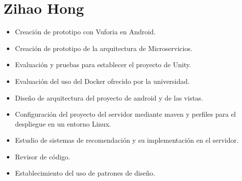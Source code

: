 \section{Zihao Hong}
\label{makereference7.4}
\begin{itemize}  
    \item Creación de prototipo con Vuforia en Android.
    \item Creación de prototipo de la arquitectura de Microservicios.
    \item Evaluación y pruebas para establecer el proyecto de Unity.
    \item Evaluación del uso del Docker ofrecido por la universidad.
    \item Diseño de arquitectura del proyecto de android y de las vistas.
    \item Configuración del proyecto del servidor mediante maven y perfiles para el despliegue en un entorno Linux.
    \item Estudio de sistemas de recomendación y su implementación en el servidor.
    \item Revisor de código.
    \item Establecimiento del uso de patrones de diseño. 
\end{itemize}